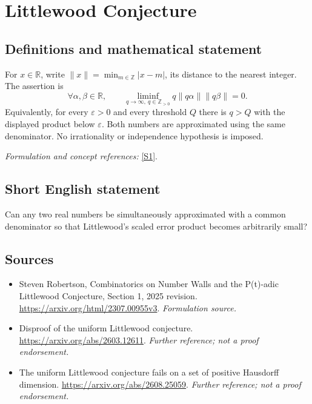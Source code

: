 \documentclass[11pt]{article}
\begin{document}
\section*{\texorpdfstring{Littlewood Conjecture}{Littlewood Conjecture}}\label{1284}
\subsection{Definitions and mathematical statement}
For $x\in{\mathbb{R}}$, write $\|x\|=\min_{m\in{\mathbb{Z}}}|x-m|$, its distance to the nearest integer. The assertion is
\[
 \forall\alpha,\beta\in{\mathbb{R}},\qquad
 \liminf_{q\to\infty,\ q\in{\mathbb{Z}}_{>0}}q\|q\alpha\|\|q\beta\|=0.
\]
Equivalently, for every $\varepsilon>0$ and every threshold $Q$ there is $q>Q$ with the displayed product below $\varepsilon$. Both numbers are approximated using the same denominator. No irrationality or independence hypothesis is imposed.
\par\smallskip\textit{Formulation and concept references:} \href{https://arxiv.org/html/2307.00955v3}{[S1]}.

\subsection{Short English statement}
Can any two real numbers be simultaneously approximated with a common denominator so that Littlewood's scaled error product becomes arbitrarily small?
\subsection{Sources}
\begin{itemize}
\item[S1]Steven Robertson, Combinatorics on Number Walls and the P(t)-adic Littlewood Conjecture, Section 1, 2025 revision.
\url{https://arxiv.org/html/2307.00955v3}.
\textit{Formulation source.}
\item[S2]Disproof of the uniform Littlewood conjecture.
\url{https://arxiv.org/abs/2603.12611}.
\textit{Further reference; not a proof endorsement.}
\item[S3]The uniform Littlewood conjecture fails on a set of positive Hausdorff dimension.
\url{https://arxiv.org/abs/2608.25059}.
\textit{Further reference; not a proof endorsement.}
\end{itemize}
\end{document}
